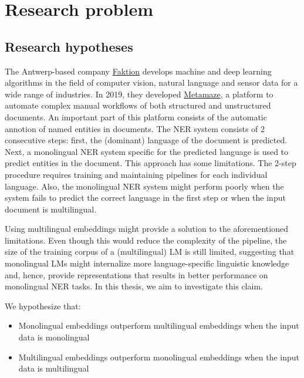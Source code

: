 \documentclass[12pt,a4paper,]{book}
\providecommand{\tightlist}{%
  \setlength{\itemsep}{0pt}\setlength{\parskip}{0pt}}
\begin{document}
\hypertarget{researchproblem}{%
\chapter{Research problem}\label{researchproblem}}

\hypertarget{research-hypotheses}{%
\section{Research hypotheses}\label{research-hypotheses}}

The Antwerp-based company \href{https://www.faktion.com/}{Faktion} develops machine and deep learning algorithms in the field of computer vision, natural language and sensor data for a wide range of industries. In 2019, they developed \href{https://metamaze.eu/}{Metamaze}, a platform to automate complex manual workflows of both structured and unstructured documents. An important part of this platform consists of the automatic annotion of named entities in documents. The NER system consists of 2 consecutive steps: first, the (dominant) language of the document is predicted. Next, a monolingual NER system specific for the predicted language is used to predict entities in the document. This approach has some limitations. The 2-step procedure requires training and maintaining pipelines for each individual language. Also, the monolingual NER system might perform poorly when the system fails to predict the correct language in the first step or when the input document is multilingual.

Using multilingual embeddings might provide a solution to the aforementioned limitations. Even though this would reduce the complexity of the pipeline, the size of the training corpus of a (multilingual) LM is still limited, suggesting that monolingual LMs might internalize more language-specific linguistic knowledge and, hence, provide representations that results in better performance on monolingual NER tasks. In this thesis, we aim to investigate this claim.

We hypothesize that:

\begin{itemize}
\tightlist
\item
  Monolingual embeddings outperform multilingual embeddings when the input data is monolingual
\item
  Multilingual embeddings outperform monolingual embeddings when the input data is multilingual
\end{itemize}
\end{document}
